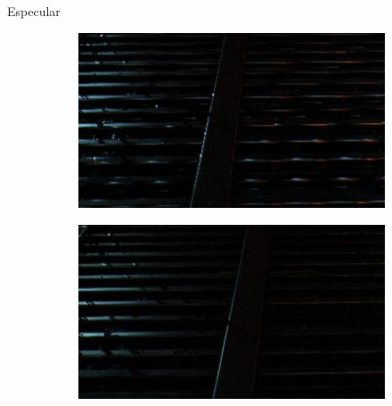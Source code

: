 \documentclass[table]{beamer}
\begin{document}
\begin{frame}[fragile]{Especular}
    \begin{figure}[!htbp]
        \centering
        \begin{subfigure}[b]{0.45\textwidth}
            \includegraphics[width=\textwidth]{figures/specular-aliasing.png}
        \end{subfigure}
        \centering
        \begin{subfigure}[b]{0.45\textwidth}
            \includegraphics[width=\textwidth]{figures/specular-fixed.png}
        \end{subfigure}
    \end{figure}
\end{frame}
\end{document}
